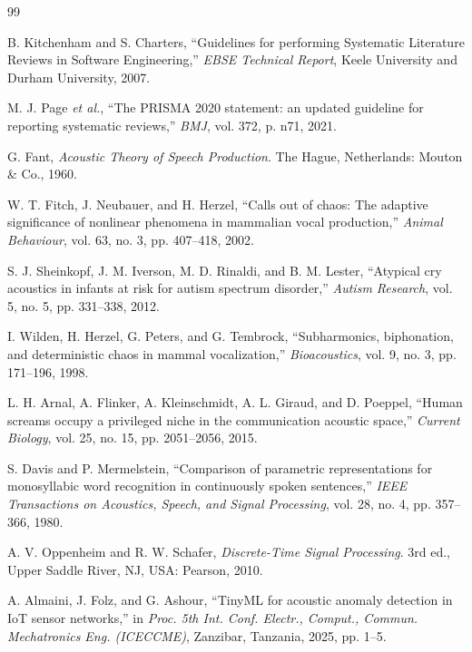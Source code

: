 \documentclass[12pt, a4paper]{report}
\begin{document}
\begin{thebibliography}{99}

B. Kitchenham and S. Charters, ``Guidelines for performing Systematic Literature Reviews in Software Engineering,'' \textit{EBSE Technical Report}, Keele University and Durham University, 2007.

M. J. Page \textit{et al.}, ``The PRISMA 2020 statement: an updated guideline for reporting systematic reviews,'' \textit{BMJ}, vol. 372, p. n71, 2021.

G. Fant, \textit{Acoustic Theory of Speech Production}. The Hague, Netherlands: Mouton \& Co., 1960.

W. T. Fitch, J. Neubauer, and H. Herzel, ``Calls out of chaos: The adaptive significance of nonlinear phenomena in mammalian vocal production,'' \textit{Animal Behaviour}, vol. 63, no. 3, pp. 407--418, 2002.

S. J. Sheinkopf, J. M. Iverson, M. D. Rinaldi, and B. M. Lester, ``Atypical cry acoustics in infants at risk for autism spectrum disorder,'' \textit{Autism Research}, vol. 5, no. 5, pp. 331--338, 2012.

I. Wilden, H. Herzel, G. Peters, and G. Tembrock, ``Subharmonics, biphonation, and deterministic chaos in mammal vocalization,'' \textit{Bioacoustics}, vol. 9, no. 3, pp. 171--196, 1998.

L. H. Arnal, A. Flinker, A. Kleinschmidt, A. L. Giraud, and D. Poeppel, ``Human screams occupy a privileged niche in the communication acoustic space,'' \textit{Current Biology}, vol. 25, no. 15, pp. 2051--2056, 2015.

S. Davis and P. Mermelstein, ``Comparison of parametric representations for monosyllabic word recognition in continuously spoken sentences,'' \textit{IEEE Transactions on Acoustics, Speech, and Signal Processing}, vol. 28, no. 4, pp. 357--366, 1980.

A. V. Oppenheim and R. W. Schafer, \textit{Discrete-Time Signal Processing}. 3rd ed., Upper Saddle River, NJ, USA: Pearson, 2010.

A. Almaini, J. Folz, and G. Ashour, ``TinyML for acoustic anomaly detection in IoT sensor networks,'' in \textit{Proc. 5th Int. Conf. Electr., Comput., Commun. Mechatronics Eng. (ICECCME)}, Zanzibar, Tanzania, 2025, pp. 1--5.


\end{thebibliography}
\end{document}
